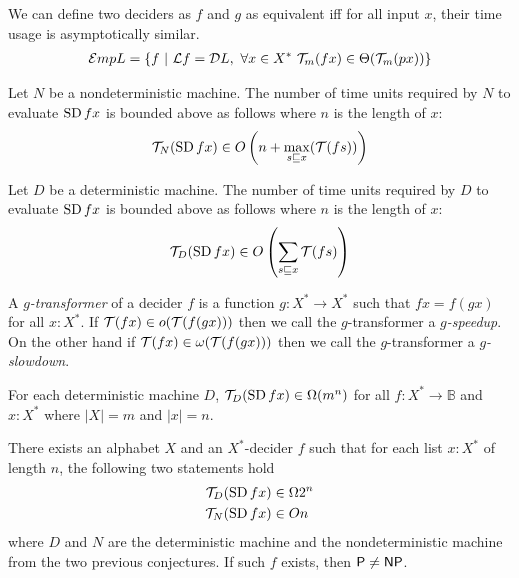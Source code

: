 \begin{mcor}
    We can define two deciders as $f$ and $g$
    as equivalent iff for all input $x$,
    their time usage is asymptotically similar.
    \begin{align}
        \mathcal E m p L = \{ f ~|~ \mathcal L f = \mathcal D L, ~ \forall x \in X^* ~ \mathcal{T}_m(fx) \in \Theta(\mathcal{T}_m(px)) \}
    \end{align}
\end{mcor}

\begin{msco}
    Let $N$ be a nondeterministic machine.
    The number of time units required by $N$
    to evaluate $\operatorname{SD} fx$ is bounded above as follows
    where $n$ is the length of $x$:
    \begin{align}
        \mathcal{T}_N(\operatorname{SD} fx) \in O\left(n + \max_{s \sqsubseteq x} (\mathcal{T}(fs))\right)
    \end{align}
\end{msco}

\begin{msco}
    Let $D$ be a deterministic machine.
    The number of time units required by $D$
    to evaluate $\operatorname{SD} fx$ is bounded above as follows
    where $n$ is the length of $x$:
    \begin{align}
        \mathcal{T}_D(\operatorname{SD} fx) \in O \left( \sum_{s \sqsubseteq x} \mathcal{T}(fs) \right)
    \end{align}
\end{msco}

A \emph{$g$-transformer} of a decider $f$ is a function $g : X^* \to X^*$
such that $fx = f(gx)$ for all $x : X^*$.
If $\mathcal{T}(fx) \in o(\mathcal{T}(f(gx)))$ then
we call the $g$-transformer a \emph{$g$-speedup}.
On the other hand if $\mathcal{T}(fx) \in \omega(\mathcal{T}(f(gx)))$ then
we call the $g$-transformer a \emph{$g$-slowdown}.

\begin{mcon}
    For each deterministic machine $D$,
    $\mathcal{T}_D(\operatorname{SD} fx) \in \Omega(m^n)$ for all $f : X^* \to \mathbb B$
    and $x : X^*$
    where $|X| = m$
    and $|x| = n$.
\end{mcon}

\begin{mcon}
There exists an alphabet $X$
and an $X^*$-decider $f$ such that
for each list $x : X^*$ of length $n$,
the following two statements hold
\begin{align}
    \mathcal{T}_D(\operatorname{SD} fx) &\in \Omega 2^n
    \\
    \mathcal{T}_N(\operatorname{SD} fx) &\in O n
\end{align}
where $D$ and $N$ are the deterministic machine
and the nondeterministic machine from the two previous conjectures.
If such $f$ exists, then $\mathsf{P} \neq \mathsf{NP}$.
\end{mcon}

